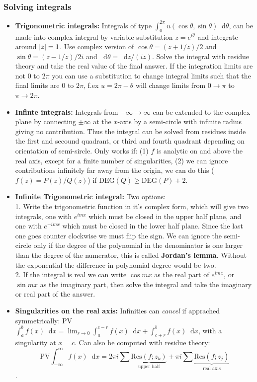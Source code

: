 \documentclass[a4paper, 10pt]{article}
\newcommand*\diff{\mathop{}\!\mathrm{d}}
\begin{document}
\begin{multicols*}{3}
\subsubsection*{Solving integrals}
\begin{itemize}
\item \textbf{Trigonometric integrals:} Integrals of type $\int_0^{2\pi} u(\cos{\theta}, \sin{\theta}) \diff \theta$, can be made into complex integral by variable substitution $z=e^{i\theta}$ and integrate around $\abs{z}=1$. Use complex version of $\cos{\theta} = (z+1/z)/2$ and $\sin{\theta}=(z-1/z)/2i$ and $\diff \theta = \diff z/(iz)$. Solve the integral with residue theory and take the real value of the final answer.
If the integration limits are not $0$ to $2\pi$ you can use a substitution to change integral limits such that the final limits are $0$ to $2\pi$, f.ex $u=2\pi-\theta$ will change limits from $0\rightarrow\pi$ to $\pi\rightarrow 2\pi$.
\item \textbf{Infinte integrals:} Integrals from $-\infty\rightarrow\infty$ can be extended to the complex plane by connecting $\pm\infty$ at the $x$-axis by a semi-circle with infinite radius giving no contribution. Thus the integral can be solved from residues inside the first and secound quadrant, or third and fourth quadrant depending on orientation of semi-sircle. Only works if: (1) $f$ is analytic on and above the real axis, except for a finite number of singularities, (2) we can ignore contributions infinitely far away from the origin, we can do this ($f(z)=P(z)/Q(z)$) if $\text{DEG}(Q) \geq \text{DEG}(P)+2$.
\item \textbf{Infinite Trigonometric integral:} Two options:\\1. Write the trigonometric function in it's complex form, which will give two integrals, one with $e^{imx}$ which must be closed in the upper half plane, and one with $e^{-imx}$ which must be closed in the lower half plane. Since the last one goes counter clockwise we must flip the sign. We can ignore the semi-circle only if the degree of the polynomial in the denominator is one larger than the degree of the numerator, this is called \textbf{Jordan's lemma}. Without the exponential the difference in polynomial degree would be two. \\2. If the integral is real we can write $\cos{mx}$ as the real part of $e^{imx}$, or $\sin{mx}$ as the imaginary part, then solve the integral and take the imaginary or real part of the answer.
\item \textbf{Singularities on the real axis:} Infinities can \textit{cancel} if apprached symmetrically: PV$\int_a^b f(x)\diff x = \lim_{r\rightarrow 0} \int_a^{c-r} f(x)\diff x + \int_{c+r}^{b}f(x)\diff x$, with a singularity at $x=c$. Can also be computed with residue theory:
$$\text{PV}\int_{-\infty}^{\infty} f(x)\diff x = 2\pi i \sum \underbrace{\text{Res}(f; z_k)}_{\text{upper half}} + \pi i \sum \underbrace{\text{Res}(f;z_j)}_{\text{real axis}}$$.
\end{itemize}
\newpage
\begin{mdframed}

\end{mdframed}
\end{multicols*}
\end{document}
